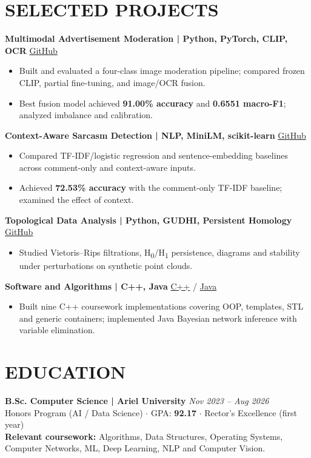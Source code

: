 \documentclass[10pt,a4paper]{article}
\begin{document}
\section*{SELECTED PROJECTS}
\textbf{Multimodal Advertisement Moderation \quad | \quad Python, PyTorch, CLIP, OCR} \hfill \href{https://github.com/naamaskital/sVLM_ads_project}{GitHub}
\begin{itemize}
\item Built and evaluated a four-class image moderation pipeline; compared frozen CLIP, partial fine-tuning, and image/OCR fusion.
\item Best fusion model achieved \textbf{91.00\% accuracy} and \textbf{0.6551 macro-F1}; analyzed imbalance and calibration.
\end{itemize}
\textbf{Context-Aware Sarcasm Detection \quad | \quad NLP, MiniLM, scikit-learn} \hfill \href{https://github.com/naamaskital/sarcasm_context_project}{GitHub}
\begin{itemize}
\item Compared TF-IDF/logistic regression and sentence-embedding baselines across comment-only and context-aware inputs.
\item Achieved \textbf{72.53\% accuracy} with the comment-only TF-IDF baseline; examined the effect of context.
\end{itemize}
\textbf{Topological Data Analysis \quad | \quad Python, GUDHI, Persistent Homology} \hfill \href{https://github.com/naamaskital/topological-data-analysis}{GitHub}
\begin{itemize}
\item Studied Vietoris--Rips filtrations, H\textsubscript{0}/H\textsubscript{1} persistence, diagrams and stability under perturbations on synthetic point clouds.
\end{itemize}
\textbf{Software and Algorithms \quad | \quad C++, Java} \hfill \href{https://github.com/naamaskital/cpp-programming-projects}{C++} / \href{https://github.com/naamaskital/bayesian-network-inference-java}{Java}
\begin{itemize}
\item Built nine C++ coursework implementations covering OOP, templates, STL and generic containers; implemented Java Bayesian network inference with variable elimination.
\end{itemize}
\section*{EDUCATION}
\textbf{B.Sc. Computer Science \quad | \quad Ariel University} \hfill \textit{Nov 2023 -- Aug 2026}\\
Honors Program (AI / Data Science) \quad $\cdot$ \quad GPA: \textbf{92.17} \quad $\cdot$ \quad Rector's Excellence (first year)\\\textbf{Relevant coursework:} Algorithms, Data Structures, Operating Systems, Computer Networks, ML, Deep Learning, NLP and Computer Vision.
\end{document}
